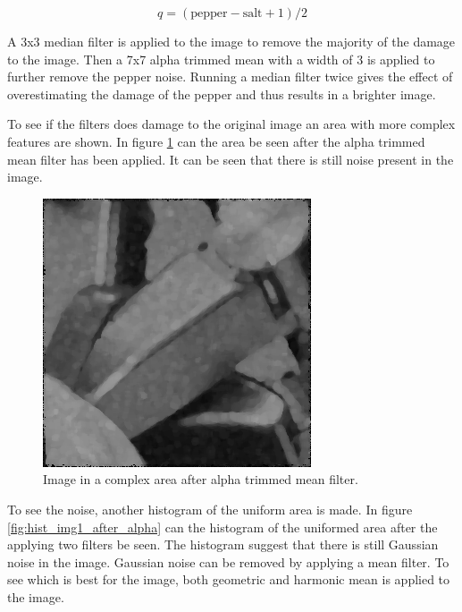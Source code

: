 \begin{equation}
 q = (\text{pepper}-\text{salt}+1)/2 \label{eq:quantile}
\end{equation}

A 3x3 median filter is applied to the image to remove the majority of the damage to the image.
Then a 7x7 alpha trimmed mean with a width of 3 is applied to further remove the pepper noise.
Running a median filter twice gives the effect of overestimating the damage of the pepper and thus results in a brighter image.

To see if the filters does damage to the original image an area with more complex features are shown.
In figure \ref{fig:complex1_after_alpha} can the area be seen after the alpha trimmed mean filter has been applied.
It can be seen that there is still noise present in the image.

\begin{figure}[H]
\centering
\includegraphics[width = \cutOutWidth]{graphics/complex1_step2}
\caption{Image in a complex area after alpha trimmed mean filter.}
\label{fig:complex1_after_alpha}
\end{figure}

To see the noise, another histogram of the uniform area is made.
In figure \ref{fig:hist_img1_after_alpha} can the histogram of the uniformed area after the applying two filters be seen.
The histogram suggest that there is still Gaussian noise in the image.
Gaussian noise can be removed by applying a mean filter.
To see which is best for the image, both geometric and harmonic mean is applied to the image.

